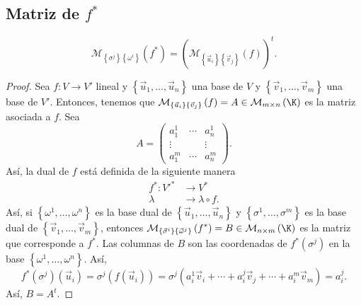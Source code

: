\subsection{Matriz de $\displaystyle f^{*} $ }
\begin{ftheorem}[]
\normalfont 
\[\mathcal{M}_{ \left\{ \sigma^{j}\right\} \left\{ \omega^{i}\right\} }\left(f^{*}\right) = \left(\mathcal{M}_{ \left\{ \vec{u}_{i}\right\} \left\{ \vec{v}_{j}\right\} }\left(f\right)\right)^{t} .\]
\end{ftheorem}
\begin{proof}
	Sea $\displaystyle f : V \to V' $ lineal y $\displaystyle \left\{ \vec{u}_{1}, \ldots, \vec{u}_{n}\right\}  $ una base de $\displaystyle V $ y $\displaystyle \left\{ \vec{v}_{1}, \ldots, \vec{v}_{m}\right\}  $ una base de $\displaystyle V' $. Entonces, tenemos que $\displaystyle \mathcal{M}_{ \left\{ \vec{u}_{i}\right\} \left\{ \vec{v}_{j}\right\} }\left(f\right) = A \in \mathcal{M}_{m \times n}\left(\K\right) $ es la matriz asociada a $\displaystyle f $. Sea 
	\[A = \begin{pmatrix} a^{1}_{1} & \cdots & a^{1}_{n} \\
	\vdots & & \vdots \\
a^{m}_{1} & \cdots & a^{m}_{n}\end{pmatrix} .\]
Así, la dual de $\displaystyle f $ está definida de la siguiente manera
\[
\begin{split}
	f^{*} : V'^{*} & \to V^{*} \\
	\lambda & \to \lambda \circ f.
\end{split}
\]
Así, si $\displaystyle \left\{ \omega^{1}, \ldots, \omega^{n}\right\}  $ es la base dual de $\displaystyle \left\{ \vec{u}_{1}, \ldots, \vec{u}_{n}\right\}  $ y $\displaystyle \left\{ \sigma^{1}, \ldots, \sigma^{m}\right\} $ es la base dual de $\displaystyle \left\{ \vec{v}_{1}, \ldots, \vec{v}_{m}\right\}  $, entonces $\displaystyle \mathcal{M}_{ \left\{ \vec{\sigma}^{i}\right\} \left\{ \vec{\omega}^{j}\right\} }\left(f^{*}\right) = B \in \mathcal{M}_{n \times m}\left(\K\right) $ es la matriz que corresponde a $\displaystyle f^{*} $. Las columnas de $\displaystyle B $ son las coordenadas de $\displaystyle f^{*}\left(\sigma^{j}\right) $ en la base $\displaystyle \left\{ \omega^{1}, \ldots, \omega^{n}\right\}  $. Así,
\[f^{*}\left(\sigma^{j}\right)\left(\vec{u}_{i}\right) = \sigma^{j}\left(f\left(\vec{u}_{i}\right)\right) = \sigma^{j}\left(a^{1}_{i}\vec{v}_{i} + \cdots + a^{j}_{i}\vec{v}_{j} + \cdots + a^{m}_{i}\vec{v}_{m}\right) = a^{j}_{i} .\]
Así, $\displaystyle B = A^{t} $.
\end{proof}

